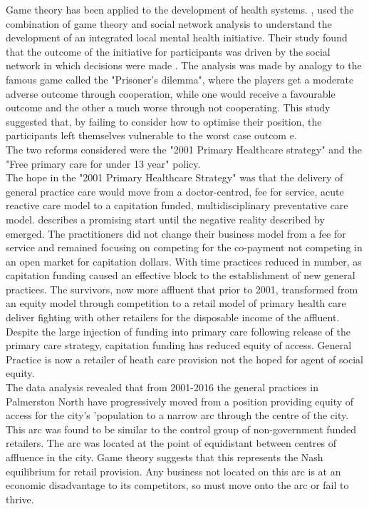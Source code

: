 \documentclass[11pt,a4paper]{article}
\begin{document}
Game theory has been applied to the development of health systems. \citet{dobson2004sustainable}, used the combination of game theory and social network analysis to understand the development of an integrated local mental health initiative. Their study found that the outcome of the initiative for participants was driven by the social network in which decisions were made \citep{dobson2004sustainable}. The analysis was made by analogy to the famous game called the "Prisoner's dilemma", where the players get a moderate adverse outcome through cooperation, while one would receive a favourable outcome and the other a much worse through not cooperating. This study suggested that, by failing to consider how to optimise their position, the participants left themselves vulnerable to the worst case outcom e\citep{dobson2004sustainable}. \\

The two reforms considered were the "2001 Primary Healthcare strategy" \citep{king2001primary} and the "Free primary care for under 13 year" policy\citep{frizelle2014health}.\\

The hope in the "2001 Primary Healthcare Strategy" \citep{king2001primary} was that the delivery of general practice care would move from a doctor-centred, fee for service, acute reactive care model to a capitation funded, multidisciplinary preventative care model. \citet{hefford2005reducing} describes a promising start until the negative reality described by \citet{howell2005restructuring} emerged. The practitioners did not change their business model from a fee for service and remained focusing on competing for the co-payment not competing in an open market for capitation dollars. With time practices reduced in number, as capitation funding caused an effective block to the establishment of new general practices. The survivors, now more affluent that prior to 2001, transformed from an equity model through competition to a retail model of primary health care deliver fighting with other retailers for the disposable income of the affluent. Despite the large injection of funding into primary care following release of the primary care strategy, capitation funding has reduced equity of access. General Practice is now a retailer of heath care provision not the hoped for agent of social equity.\\

The data analysis revealed that from 2001-2016 the general practices in Palmerston North have progressively moved from a position providing equity of access for the city's 'population to a narrow arc through the centre of the city. This arc was found to be similar to the control group of non-government funded retailers. The arc was located at the point of equidistant between centres of affluence in the city. Game theory suggests that this represents the Nash equilibrium for retail provision. Any business not located on this arc is at an economic disadvantage to its competitors, so must move onto the arc or fail to thrive.\\
\end{document}
